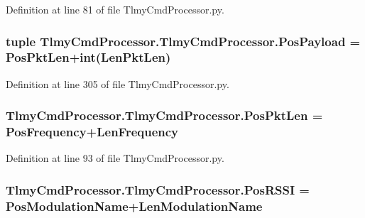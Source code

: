 Definition at line 81 of file Tlmy\+Cmd\+Processor.\+py.

\hypertarget{namespace_tlmy_cmd_processor_1_1_tlmy_cmd_processor_ad810c911ba6a417e2078e5c9e3d06e70}{}
\subsubsection[{Pos\+Payload}]{\setlength{\rightskip}{0pt plus 5cm}tuple Tlmy\+Cmd\+Processor.\+Tlmy\+Cmd\+Processor.\+Pos\+Payload = {\bf Pos\+Pkt\+Len}+int({\bf Len\+Pkt\+Len})}\label{namespace_tlmy_cmd_processor_1_1_tlmy_cmd_processor_ad810c911ba6a417e2078e5c9e3d06e70}


Definition at line 305 of file Tlmy\+Cmd\+Processor.\+py.

\hypertarget{namespace_tlmy_cmd_processor_1_1_tlmy_cmd_processor_acba5b0985ab65f322a69d59144555d63}{}
\subsubsection[{Pos\+Pkt\+Len}]{\setlength{\rightskip}{0pt plus 5cm}Tlmy\+Cmd\+Processor.\+Tlmy\+Cmd\+Processor.\+Pos\+Pkt\+Len = {\bf Pos\+Frequency}+{\bf Len\+Frequency}}\label{namespace_tlmy_cmd_processor_1_1_tlmy_cmd_processor_acba5b0985ab65f322a69d59144555d63}


Definition at line 93 of file Tlmy\+Cmd\+Processor.\+py.

\hypertarget{namespace_tlmy_cmd_processor_1_1_tlmy_cmd_processor_ab27c15b24c6222fb45f6825e563bfeae}{}
\subsubsection[{Pos\+R\+S\+S\+I}]{\setlength{\rightskip}{0pt plus 5cm}Tlmy\+Cmd\+Processor.\+Tlmy\+Cmd\+Processor.\+Pos\+R\+S\+S\+I = {\bf Pos\+Modulation\+Name}+{\bf Len\+Modulation\+Name}}\label{namespace_tlmy_cmd_processor_1_1_tlmy_cmd_processor_ab27c15b24c6222fb45f6825e563bfeae}


